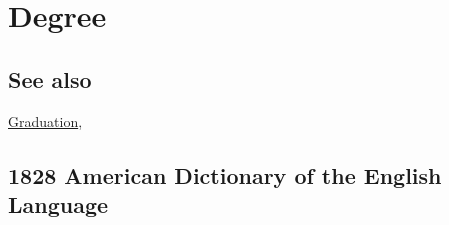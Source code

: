 \section{Degree}
	\label{DEGREE}
	
\subsection{See also}

	\hyperref[GRADUATION]{Graduation},

\subsection{1828 American Dictionary of the English Language} %
	\label{DEGREE-1828}

